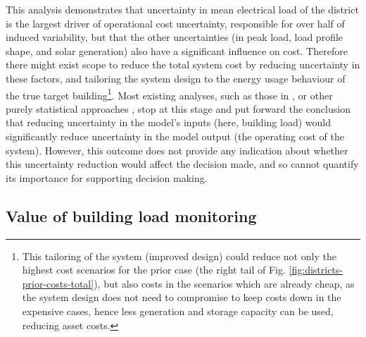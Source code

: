 This analysis demonstrates that uncertainty in mean electrical load of the district is the largest driver of operational cost uncertainty, responsible for over half of induced variability, but that the other uncertainties (in peak load, load profile shape, and solar generation) also have a significant influence on cost.
Therefore there might exist scope to reduce the total system cost by reducing uncertainty in these factors, and tailoring the system design to the energy usage behaviour of the true target building\footnote{This tailoring of the system (improved design) could reduce not only the highest cost scenarios for the prior case (the right tail of Fig. \ref{fig:districts-prior-costs-total}), but also costs in the scenarios which are already cheap, as the system design does not need to compromise to keep costs down in the expensive cases, hence less generation and storage capacity can be used, reducing asset costs.}.
Most existing analyses, such as those in \citep{mavromatidis2018ReviewUncertaintyCharacterisation,prataviera2022EvaluationImpactInput}, or other purely statistical approaches \citep{pang2020RoleSensitivityAnalysis}, stop at this stage and put forward the conclusion that reducing uncertainty in the model's inputs (here, building load) would significantly reduce uncertainty in the model output (the operating cost of the system). However, this outcome does not provide any indication about whether this uncertainty reduction would affect the decision made, and so cannot quantify its importance for supporting decision making.


\subsection{Value of building load monitoring} \label{sec:districts-voi-results}



